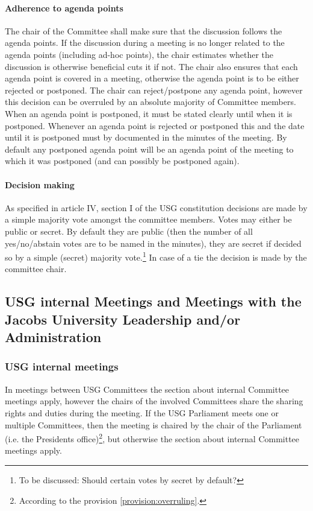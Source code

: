 \paragraph{Adherence to agenda points}
The chair of the Committee shall make sure that the discussion follows the agenda points. If the discussion during a meeting is no longer related to the agenda points (including ad-hoc points), the chair estimates whether the discussion is otherwise beneficial cuts it if not. 
The chair also ensures that each agenda point is covered in a meeting, otherwise the agenda point is to be either rejected or postponed. The chair can reject/postpone any agenda point, however this decision can be overruled by an absolute majority of Committee members. When an agenda point is postponed, it must be stated clearly until when it is postponed. Whenever an agenda point is rejected or postponed this and the date until it is postponed must by documented in the minutes of the meeting. By default any postponed agenda point will be an agenda point of the meeting to which it was postponed (and can possibly be postponed again). 


\paragraph{Decision making}
As specified in article IV, section I of the USG constitution decisions are made by a simple majority vote amongst the committee members. Votes may either be public or secret. By default they are public (then the number of all yes/no/abstain votes are to be named in the minutes), they are secret if decided so by a simple (secret) majority vote.\protect\footnote{To be discussed: Should certain votes by secret by default?} In case of a tie the decision is made by the committee chair.

\subsection[Non-internal Meetings]{USG internal Meetings and Meetings with the Jacobs University Leadership and/or Administration}
\subsubsection{USG internal meetings}
  In meetings between USG Committees the section about internal Committee meetings apply, however the chairs of the involved Committees share the sharing rights and duties during the meeting.
  If the USG Parliament meets one or multiple Committees, then the meeting is chaired by the chair of the Parliament (i.e. the Presidents office)\protect\footnote{According to the provision \ref{provision:overruling}.}, but otherwise the section about internal Committee meetings apply.
